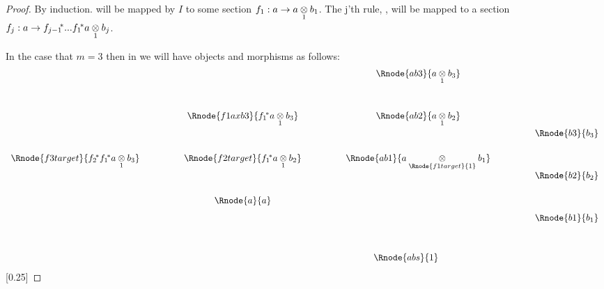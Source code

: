 \begin{proof}
By induction.
 will be mapped by $I$ to some section $f_1:a \morph \crossx{a}{b_1}{1}$. The j'th rule,
, will be mapped to a section $f_j:a \morph \fjpstar ... \fonestar\crossx{a}{b_j}{1}$.

In the case that $m=3$  then in \catcw we will have objects and morphisms as follows:
\begin{displaymath}
\begin{array}{c p{1cm} c p {1cm} c  p{1cm} c}
                                                &&                                           && \Rnode{ab3}{\crossx{a}{b_3}{1}}                       \\[1.2cm]
                                                &&\Rnode{f1axb3}{\fonestar\crossx{a}{b_3}{1}}  && \Rnode{ab2}{\crossx{a}{b_2}{1}}                       \\[1.2cm]
 \Rnode{f3target}{\ftwostar\fonestar\crossx{a}{b_3}{1}} &&\Rnode{f2target}{\fonestar\crossx{a}{b_2}{1}}  && \Rnode{ab1}{\crossx{a}{b_1}{\Rnode{f1target}{1}}}     \\[1.2cm]
                                                &&\Rnode{a}{a}                               &&                                                       \\[-3.0cm]
																								&&                                           &&                         && \Rnode{b3}{b_3}             \\[1.2cm]
																								&&                                           &&                         && \Rnode{b2}{b_2}             \\[1.2cm]
																								&&                                           &&                         && \Rnode{b1}{b_1}             \\[1.1cm]
																								&&                                           && \Rnode{abs}{1} \ \ \ \ \ \ \ \ &&    
\end{array}
\end{displaymath}
[0.25]
\end{proof}

